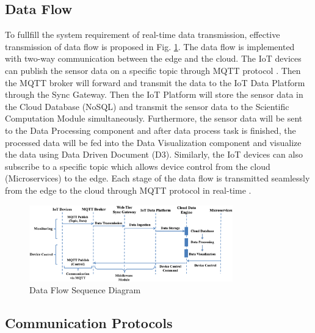 \documentclass[conference]{IEEEtran}
\begin{document}


\subsection{Data Flow}\label{DF}

To fullfill the system requirement of real-time data transmission, effective transmission of data flow is proposed in Fig. \ref{dataflow}. The data flow is implemented with two-way communication between the edge and the cloud. The IoT devices can publish the sensor data on a specific topic through MQTT protocol \cite{b12}. Then the MQTT broker will forward and transmit the data to the IoT Data Platform through the Sync Gateway. Then the IoT Platform will store the sensor data in the Cloud Database (NoSQL) and transmit the sensor data to the Scientific Computation Module simultaneously. Furthermore, the sensor data will be sent to the Data Processing component and after data process task is finished, the processed data will be fed into the Data Visualization component and visualize the data using Data Driven Document (D3). Similarly, the IoT devices can also subscribe to a specific topic which allows device control from the cloud (Microservices) to the edge. Each stage of the data flow is transmitted seamlessly from the edge to the cloud through MQTT protocol in real-time \cite{b13}.

\begin{figure}[htbp]
\centering
\includegraphics[width=250pt]{dataflow.png}
\caption{Data Flow Sequence Diagram}
\label{dataflow}
\end{figure}






\subsection{Communication Protocols}\label{com}
\end{document}
